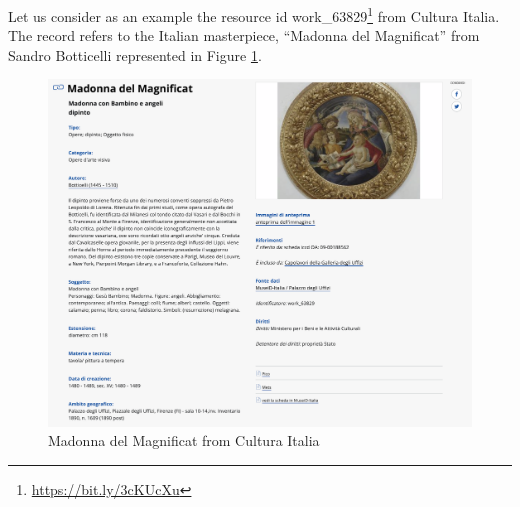 \documentclass[epsfig,a4paper,12pt,titlepage]{book}
\begin{document}

Let us consider as an example the resource id work\_63829\footnote{\url{https://bit.ly/3cKUcXu}} from Cultura Italia. The record refers to the Italian masterpiece, ``Madonna del Magnificat'' from Sandro Botticelli represented in Figure \ref{magnificat}.
\begin{figure}[H]
\includegraphics[width=16cm]{magnificat.png}
\caption{Madonna del Magnificat from Cultura Italia}
\label{magnificat}
\end{figure}
\end{document}
